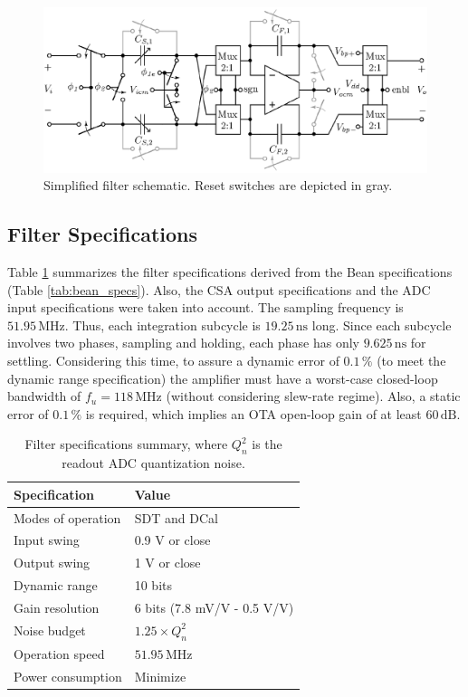 \begin{figure}[!t]
	\centering
	\includegraphics[width=6in]{./Figures/Filter/filter_post.eps}
	\caption{Simplified filter schematic. Reset switches are depicted in gray.}\label{fig:filter_post}
\end{figure}

\subsection{Filter Specifications}

Table \ref{tab:filter_specs} summarizes the filter specifications derived from the Bean specifications (Table \ref{tab:bean_specs}). Also, the CSA output specifications and the ADC input specifications were taken into account. The sampling frequency is $51.95\,\text{MHz}$. Thus, each integration subcycle is $19.25\,\text{ns}$ long. Since each subcycle involves two phases, sampling and holding, each phase has only $9.625\,\text{ns}$ for settling. Considering this time, to assure a dynamic error of $0.1\,\%$ (to meet the dynamic range specification) the amplifier must have a \mbox{worst-case} \mbox{closed-loop} bandwidth of $f_u = 118\,\text{MHz}$ (without considering slew-rate regime). Also, a static error of $0.1\,\%$ is required, which implies an OTA open-loop gain of at least $60\,\text{dB}$. 

\begin{table}[!t]
	\begin{center}
		\begin{tabular}{|l|l|}\hline
			{\bf Specification} & {\bf Value} \\ \hline\hline
			Modes of operation & SDT and DCal \\ \hline
			Input swing & 0.9 V or close \\ \hline
			Output swing & 1 V or close \\ \hline
			Dynamic range & 10 bits \\ \hline
			Gain resolution & 6 bits (7.8 mV/V - 0.5 V/V) \\ \hline
			Noise budget & $1.25\times Q_n^2$ \\ \hline
			Operation speed & $51.95\,\text{MHz}$ \\ \hline
			Power consumption & Minimize\\\hline
		\end{tabular}
		\vspace*{5pt}
		\caption{Filter specifications summary, where $Q_n^2$ is the readout ADC quantization noise.}\label{tab:filter_specs}
	\end{center}
\end{table}


